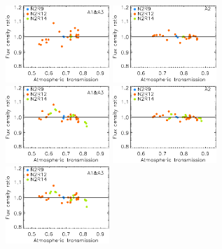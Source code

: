 \begin{figure}[ht!]
\begin{center}
    \vspace{0.3cm}
    \includegraphics[clip=true, trim={0, -0.3cm, -0.3cm, 0}, width=0.35\textwidth]{Figures/Calibration/plot_flux_density_ratio_obstau_uranus_skydip_narrow_1mm.pdf}\hspace{0.2cm}
    \includegraphics[clip=true, trim={0, -0.3cm, -0.3cm, 0}, width=0.35\textwidth]{Figures/Calibration/plot_flux_density_ratio_obstau_uranus_skydip_narrow_a2.pdf}
    \vspace{0.3cm}
    \includegraphics[clip=true, trim={0, -0.3cm, -0.3cm, 0}, width=0.35\textwidth]{Figures/Calibration/plot_flux_density_ratio_obstau_uranus_corrected_skydip_photocorr_demo_narrow_1mm.pdf}\hspace{0.2cm}
    \includegraphics[clip=true, trim={0, -0.3cm, -0.3cm, 0}, width=0.35\textwidth]{Figures/Calibration/plot_flux_density_ratio_obstau_uranus_corrected_skydip_photocorr_demo_narrow_a2.pdf}
    \vspace{0.3cm}
    \includegraphics[clip=true, width=0.35\textwidth]{Figures/Calibration/plot_flux_density_ratio_obstau_uranus_corrected_skydip_photocorr_pointing_narrow_1mm.pdf}\hspace{0.2cm}

\end{center}
\end{figure}
